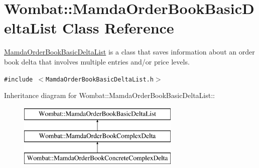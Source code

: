 \hypertarget{classWombat_1_1MamdaOrderBookBasicDeltaList}{
\section{Wombat::Mamda\-Order\-Book\-Basic\-Delta\-List Class Reference}
\label{classWombat_1_1MamdaOrderBookBasicDeltaList}
}
\hyperlink{classWombat_1_1MamdaOrderBookBasicDeltaList}{Mamda\-Order\-Book\-Basic\-Delta\-List} is a class that saves information about an order book delta that involves multiple entries and/or price levels.  


{\tt \#include $<$Mamda\-Order\-Book\-Basic\-Delta\-List.h$>$}

Inheritance diagram for Wombat::Mamda\-Order\-Book\-Basic\-Delta\-List::\begin{figure}[H]
\begin{center}
\leavevmode
\includegraphics[height=3cm]{classWombat_1_1MamdaOrderBookBasicDeltaList}
\end{center}
\end{figure}
